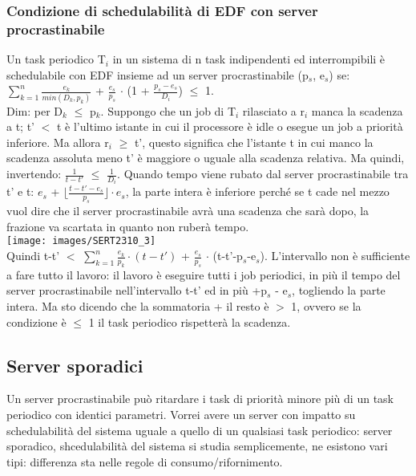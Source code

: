 \documentclass[18px]{article}
\begin{document}
\subsubsection{Condizione di schedulabilità di EDF con server procrastinabile}
Un task periodico T$_{i}$ in un sistema di n task indipendenti ed interrompibili è schedulabile con EDF insieme ad un server procrastinabile (p$_{s}$, e$_{s}$) se:\\ $\sum\limits_{k = 1}^{n} \frac{e_k}{min(D_k, p_k)}$ + $\frac{e_s}{p_s}$ $\cdot$ (1 + $\frac{p_s - e_s}{D_i}$) $\leq$ 1.\\ Dim: per D$_{k}$ $\leq$ p$_{k}$. Suppongo che un job di T$_{i}$ rilasciato a r$_{i}$ manca la scadenza a t; t' $<$ t è l'ultimo istante in cui il processore è idle o esegue un job a priorità inferiore. Ma allora r$_{i}$ $\geq$ t', questo significa che l'istante t in cui manco la scadenza assoluta meno t' è maggiore o uguale alla scadenza relativa. Ma quindi, invertendo: $\frac{1}{t-t'}$ $\leq$ $\frac{1}{D_i}$. Quando tempo viene rubato dal server procrastinabile tra t' e t: $e_{s}$ + $\lfloor \frac{t - t'- e_s}{p_s}\rfloor \cdot e_s$, la parte intera è inferiore perché se t cade nel mezzo vuol dire che il server procrastinabile avrà una scadenza che sarà dopo, la frazione va scartata in quanto non ruberà tempo.\\
\texttt{[image: images/SERT2310\_3]}\\
Quindi t-t' $<$ $\sum\limits_{k=1}^{n} \frac{e_k}{p_k} \cdot (t-t')$ + $\frac{e_s}{p_s}$ $\cdot$ (t-t'-p$_s$-e$_{s}$). L'intervallo non è sufficiente a fare tutto il lavoro: il lavoro è eseguire tutti i job periodici, in più il tempo del server procrastinabile nell'intervallo t-t' ed in più +p$_{s}$ - e$_{s}$, togliendo la parte intera. Ma sto dicendo che la sommatoria + il resto è $>$ 1, ovvero se la condizione è $\leq$ 1 il task periodico rispetterà la scadenza.
\subsection{Server sporadici}
Un server procrastinabile può ritardare i task di priorità minore più di un task periodico con identici parametri. Vorrei avere un server con impatto su schedulabilità del sistema uguale a quello di un qualsiasi task periodico: server sporadico, shcedulabilità del sistema si studia semplicemente, ne esistono vari tipi: differenza sta nelle regole di consumo/rifornimento.
\end{document}
